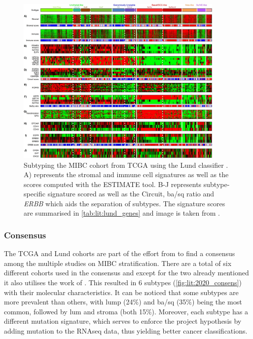 \begin{figure}[!t]   
\centering
\includegraphics[width=0.9\textwidth,height=0.9\textheight,keepaspectratio]{Sections/Lit_review/Resources/Lung_subtypes.jpg}
  \caption{Subtyping the MIBC cohort from TCGA using the Lund classifier \cite{Marzouka2018-ge}. A) represents the stromal and immune cell signatures as well as the scores computed with the ESTIMATE tool\cite{Yoshihara2013-wq}. B-J represents subtype-specific signature scored as well as the Circuit, \acrshort{ba/sq} ratio and \textit{ERBB} which aids the separation of subtypes. The signature scores are summarised in \cref{tab:lit:lund_genes} and image is taken from \cite{Marzouka2018-ge}.
}
\label{fig:lit:lund_fig}
\end{figure}
\FloatBarrier


\subsubsection*{Consensus} \label{s:lit:consensus_mibc}

The TCGA and Lund cohorts are part of the effort from \citet{Kamoun2020-tj} to find a consensus among the multiple studies on MIBC stratification. There are a total of six different cohorts used in the consensus and except for the two already mentioned \citet{Kamoun2020-tj} it also utilises the work of \citet{Mo2018-rl, Damrauer2014-tc, Choi2014-ed, Rebouissou2014-ep}. This resulted in 6 subtypes (\cref{fig:lit:2020_consens}) with their molecular characteristics. It can be noticed that some subtypes are more prevalent than others, with \acrfull{lump} (24\%) and \acrlong{ba/sq} (35\%) being the most common, followed by \acrlong{lum} and \acrlong{stroma} (both 15\%). Moreover, each subtype has a different mutation signature, which serves to enforce the project hypothesis by adding mutation to the RNAseq data, thus yielding better cancer classifications.

